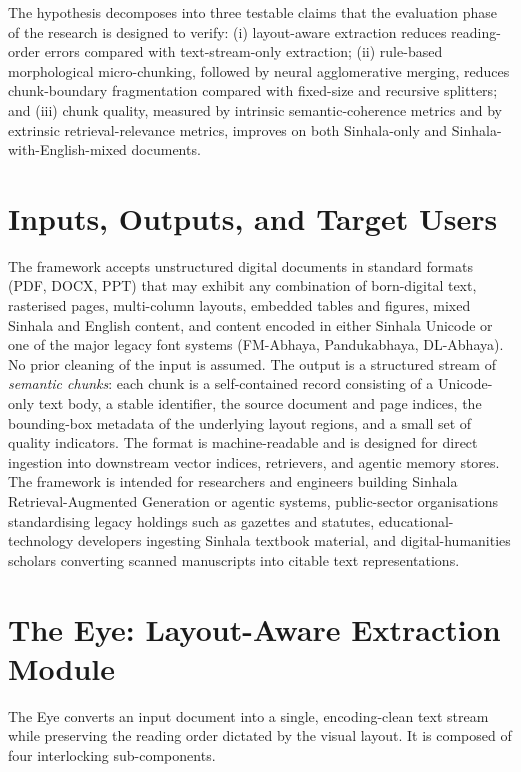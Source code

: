 \documentclass[12pt,a4paper,oneside]{report}
\begin{document}
The hypothesis decomposes into three testable claims that the evaluation phase of the research is designed to verify: (i) layout-aware extraction reduces reading-order errors compared with text-stream-only extraction; (ii) rule-based morphological micro-chunking, followed by neural agglomerative merging, reduces chunk-boundary fragmentation compared with fixed-size and recursive splitters; and (iii) chunk quality, measured by intrinsic semantic-coherence metrics and by extrinsic retrieval-relevance metrics, improves on both Sinhala-only and Sinhala-with-English-mixed documents.

\section{Inputs, Outputs, and Target Users}
\label{sec:approach-io}
The framework accepts unstructured digital documents in standard formats (PDF, DOCX, PPT) that may exhibit any combination of born-digital text, rasterised pages, multi-column layouts, embedded tables and figures, mixed Sinhala and English content, and content encoded in either Sinhala Unicode or one of the major legacy font systems (FM-Abhaya, Pandukabhaya, DL-Abhaya). No prior cleaning of the input is assumed. The output is a structured stream of \textit{semantic chunks}: each chunk is a self-contained record consisting of a Unicode-only text body, a stable identifier, the source document and page indices, the bounding-box metadata of the underlying layout regions, and a small set of quality indicators. The format is machine-readable and is designed for direct ingestion into downstream vector indices, retrievers, and agentic memory stores. The framework is intended for researchers and engineers building Sinhala Retrieval-Augmented Generation or agentic systems, public-sector organisations standardising legacy holdings such as gazettes and statutes, educational-technology developers ingesting Sinhala textbook material, and digital-humanities scholars converting scanned manuscripts into citable text representations.

\section{The Eye: Layout-Aware Extraction Module}
\label{sec:approach-eye}
The Eye converts an input document into a single, encoding-clean text stream while preserving the reading order dictated by the visual layout. It is composed of four interlocking sub-components.
\end{document}
